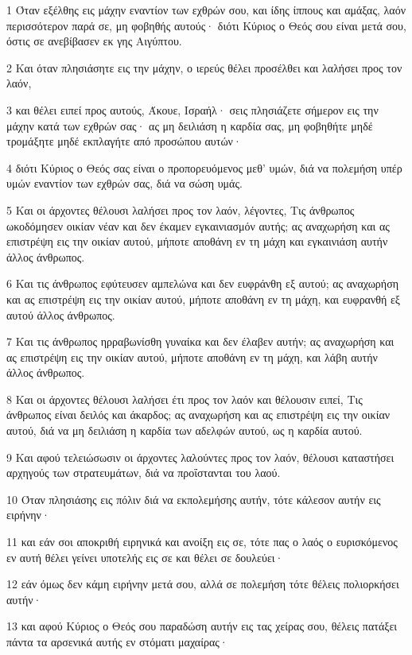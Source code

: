 \par 1 Όταν εξέλθης εις μάχην εναντίον των εχθρών σου, και ίδης ίππους και αμάξας, λαόν περισσότερον παρά σε, μη φοβηθής αυτούς· διότι Κύριος ο Θεός σου είναι μετά σου, όστις σε ανεβίβασεν εκ γης Αιγύπτου.
\par 2 Και όταν πλησιάσητε εις την μάχην, ο ιερεύς θέλει προσέλθει και λαλήσει προς τον λαόν,
\par 3 και θέλει ειπεί προς αυτούς, Άκουε, Ισραήλ· σεις πλησιάζετε σήμερον εις την μάχην κατά των εχθρών σας· ας μη δειλιάση η καρδία σας, μη φοβηθήτε μηδέ τρομάξητε μηδέ εκπλαγήτε από προσώπου αυτών·
\par 4 διότι Κύριος ο Θεός σας είναι ο προπορευόμενος μεθ' υμών, διά να πολεμήση υπέρ υμών εναντίον των εχθρών σας, διά να σώση υμάς.
\par 5 Και οι άρχοντες θέλουσι λαλήσει προς τον λαόν, λέγοντες, Τις άνθρωπος ωκοδόμησεν οικίαν νέαν και δεν έκαμεν εγκαινιασμόν αυτής; ας αναχωρήση και ας επιστρέψη εις την οικίαν αυτού, μήποτε αποθάνη εν τη μάχη και εγκαινιάση αυτήν άλλος άνθρωπος.
\par 6 Και τις άνθρωπος εφύτευσεν αμπελώνα και δεν ευφράνθη εξ αυτού; ας αναχωρήση και ας επιστρέψη εις την οικίαν αυτού, μήποτε αποθάνη εν τη μάχη, και ευφρανθή εξ αυτού άλλος άνθρωπος.
\par 7 Και τις άνθρωπος ηρραβωνίσθη γυναίκα και δεν έλαβεν αυτήν; ας αναχωρήση και ας επιστρέψη εις την οικίαν αυτού, μήποτε αποθάνη εν τη μάχη, και λάβη αυτήν άλλος άνθρωπος.
\par 8 Και οι άρχοντες θέλουσι λαλήσει έτι προς τον λαόν και θέλουσιν ειπεί, Τις άνθρωπος είναι δειλός και άκαρδος; ας αναχωρήση και ας επιστρέψη εις την οικίαν αυτού, διά να μη δειλιάση η καρδία των αδελφών αυτού, ως η καρδία αυτού.
\par 9 Και αφού τελειώσωσιν οι άρχοντες λαλούντες προς τον λαόν, θέλουσι καταστήσει αρχηγούς των στρατευμάτων, διά να προΐστανται του λαού.
\par 10 Όταν πλησιάσης εις πόλιν διά να εκπολεμήσης αυτήν, τότε κάλεσον αυτήν εις ειρήνην·
\par 11 και εάν σοι αποκριθή ειρηνικά και ανοίξη εις σε, τότε πας ο λαός ο ευρισκόμενος εν αυτή θέλει γείνει υποτελής εις σε και θέλει σε δουλεύει·
\par 12 εάν όμως δεν κάμη ειρήνην μετά σου, αλλά σε πολεμήση τότε θέλεις πολιορκήσει αυτήν·
\par 13 και αφού Κύριος ο Θεός σου παραδώση αυτήν εις τας χείρας σου, θέλεις πατάξει πάντα τα αρσενικά αυτής εν στόματι μαχαίρας·
